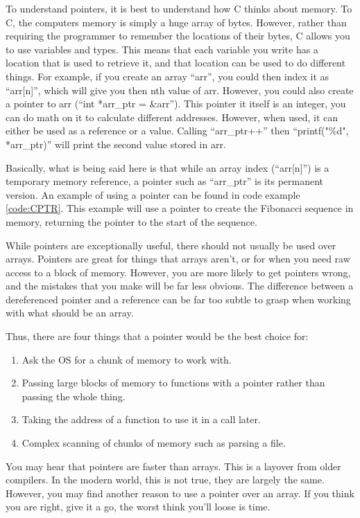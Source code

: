 \documentclass[a4paper,11pt]{report}
\begin{document}
			To understand pointers, it is best to understand how C thinks about memory. 
			To C, the computers memory is simply a huge array of bytes. 
			However, rather than requiring the programmer to remember the locations of their bytes, C allows you to use variables and types. 
			This means that each variable you write has a location that is used to retrieve it, and that location can be used to do different things. 
			For example, if you create an array ``arr'', you could then index it as ``arr[n]'', which will give you then nth value of arr. 
			However, you could also create a pointer to arr (``int *arr\_ptr = \&arr''). 
			This pointer it itself is an integer, you can do math on it to calculate different addresses. 
			However, when used, it can either be used as a reference or a value. 
			Calling ``arr\_ptr++'' then ``printf("\%d", *arr\_ptr)'' will print the second value stored in arr. 

			Basically, what is being said here is that while an array index (``arr[n]'') is a temporary memory reference, a pointer such as ``arr\_ptr'' is its permanent version. 
			An example of using a pointer can be found in code example \ref{code:CPTR}. 
			This example will use a pointer to create the Fibonacci sequence in memory, returning the pointer to the start of the sequence. 
			\begin{code}
				C}]{./CPointers.c}
				\caption{Example of a C Pointers}
				\label{code:CPTR}
			\end{code}

			While pointers are exceptionally useful, there should not usually be used over arrays. 
			Pointers are great for things that arrays aren't, or for when you need raw access to a block of memory. 
			However, you are more likely to get pointers wrong, and the mistakes that you make will be far less obvious. 
			The difference between a dereferenced pointer and a reference can be far too subtle to grasp when working with what should be an array. 

			Thus, there are four things that a pointer would be the best choice for:
			\begin{enumerate}
				\item Ask the OS for a chunk of memory to work with. 
				\item Passing large blocks of memory to functions with a pointer rather than passing the whole thing. 
				\item Taking the address of a function to use it in a call later. 
				\item Complex scanning of chunks of memory such as parsing a file. 
			\end{enumerate}
			You may hear that pointers are faster than arrays. 
			This is a layover from older compilers. 
			In the modern world, this is not true, they are largely the same. 
			However, you may find another reason to use a pointer over an array. 
			If you think you are right, give it a go, the worst think you'll loose is time. 
\end{document}
